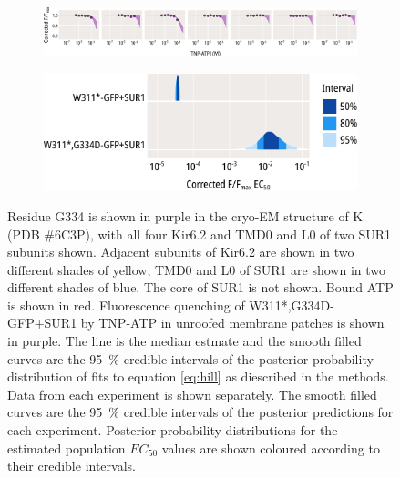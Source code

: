 \begin{figure}[hbtp]
\begin{subfigure}[t]{0.45\textwidth}
	\end{subfigure}
	\vfill
	\begin{subfigure}[t]{0.9\textwidth}
		\caption{}\label{ch5fig:g334d_indfits}
		\centering
		\includegraphics[width=\textwidth]{g334d_3.pdf}
	\end{subfigure}
	\vfill
	\begin{subfigure}[t]{0.7\textwidth}
		\caption{}\label{ch5fig:g334d_params}
		\centering
		\includegraphics[width=\textwidth]{g334d_4.pdf}
	\end{subfigure}
	\caption[G334D abolishes nucleotide binding at Kir6.2]{
	{\bf{}}
	 Residue G334 is shown in purple in the cryo-EM structure of K\ATP{} (PDB \#6C3P), with all four Kir6.2 and TMD0 and L0 of two SUR1 subunits shown.
	Adjacent subunits of Kir6.2 are shown in two different shades of yellow, TMD0 and L0 of SUR1 are shown in two different shades of blue.
	The core of SUR1 is not shown.
	Bound ATP is shown in red.
	 Fluorescence quenching of W311*,G334D-GFP+SUR1 by TNP-ATP in unroofed membrane patches is shown in purple.
	The line is the median estmate and the smooth filled curves are the \SI{95}{\percent} credible intervals of the posterior probability distribution of fits to equation \ref{eq:hill} as diescribed in the methods.
	 Data from each experiment is shown separately.
	The smooth filled curves are the \SI{95}{\percent} credible intervals of the posterior predictions for each experiment.
	 Posterior probability distributions for the estimated population $EC_{50}$ values are shown coloured according to their credible intervals.
	}\label{ch5fig:g334d}
\end{figure}

